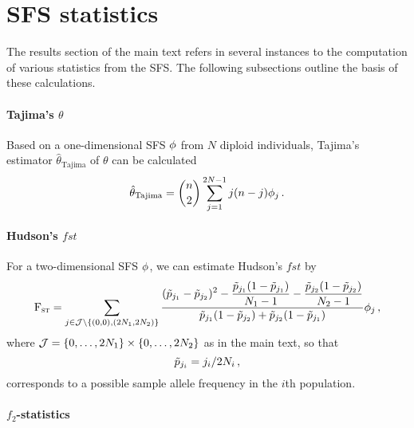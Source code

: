 \section{SFS statistics}\label{text:sfsstatistics}

The results section of the main text refers in several instances to the computation of various statistics from the SFS.
The following subsections outline the basis of these calculations.

\paragraph{Tajima's $\theta$}

Based on a one-dimensional SFS $\phi$ from $N$ diploid individuals, Tajima's estimator $\hat{\theta}_{\text{Tajima}}$ of $\theta$ can be calculated \cite{Korneliussen2013}
%
\begin{equation}\label{eq:sfstajima}
    \hat{\theta}_{\text{Tajima}}
    =
    \binom{n}{2} \sum_{j = 1}^{2N - 1} j(n - j) \phi_j 
    \, .
\end{equation}

\paragraph{Hudson's $fst$}

For a two-dimensional SFS $\phi$, we can estimate Hudson's $fst$ by \cite{Bhatia2013}
%
\begin{equation}{\label{eq:sfsfst}}
    \text{F}_{\textsc{st}}
    =
    \sum_{j \in \mathcal{J} \setminus \{(0, 0), (2N_1, 2N_2)\}} 
    \frac{\displaystyle
        (\tilde{p}_{j_{1}} - \tilde{p}_{j_{2}})^2 
        - 
        \frac{\tilde{p}_{j_{1}}(1 - \tilde{p}_{j_{1}})}{N_1 - 1} 
        - 
        \frac{\tilde{p}_{j_{2}}(1 - \tilde{p}_{j_{2}})}{N_2 - 1}
    }{
        \tilde{p}_{j_{1}}(1 - \tilde{p}_{j_{2}})
        + 
        \tilde{p}_{j_{2}}(1 - \tilde{p}_{j_{1}})
    } \phi_j \, ,
\end{equation}
%
where $\mathcal{J} = \{0, \dots, 2N_1\} \times \{0, \dots, 2N_2\}$ as in the main text, so that
%
\begin{equation}
    \tilde{p}_{j_{i}} = j_i / 2N_i
    \, ,
\end{equation}
%
corresponds to a possible sample allele frequency in the $i$th population.

\paragraph{$f_2$-statistics}

